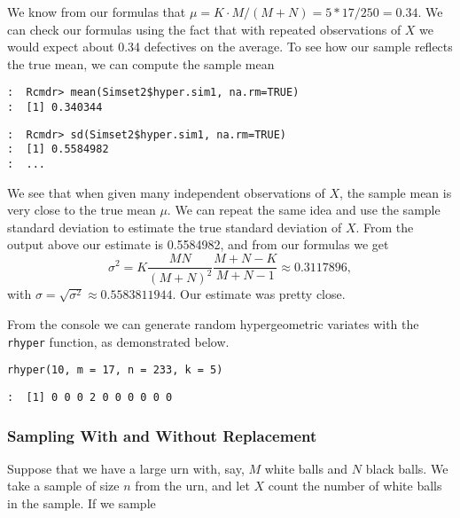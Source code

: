 We know from our formulas that \(\mu=K\cdot
M/(M+N)=5*17/250=0.34\). We can check our formulas using the fact that
with repeated observations of \(X\) we would expect about 0.34
defectives on the average. To see how our sample reflects the true
mean, we can compute the sample mean

\begin{verbatim}
:  Rcmdr> mean(Simset2$hyper.sim1, na.rm=TRUE)
:  [1] 0.340344
\end{verbatim}

\begin{verbatim}
:  Rcmdr> sd(Simset2$hyper.sim1, na.rm=TRUE)
:  [1] 0.5584982
:  ...
\end{verbatim}

We see that when given many independent observations of \(X\), the
sample mean is very close to the true mean \(\mu\). We can repeat the
same idea and use the sample standard deviation to estimate the true
standard deviation of \(X\). From the output above our estimate is
0.5584982, and from our formulas we get
\[
\sigma^{2}=K\frac{MN}{(M+N)^{2}}\frac{M+N-K}{M+N-1}\approx0.3117896,
\]
with \(\sigma=\sqrt{\sigma^{2}}\approx0.5583811944\). Our estimate was
pretty close.

From the console we can generate random hypergeometric variates with
the \texttt{rhyper} function, as demonstrated below.

\begin{verbatim}
rhyper(10, m = 17, n = 233, k = 5)
\end{verbatim}

\begin{verbatim}
:  [1] 0 0 0 2 0 0 0 0 0 0
\end{verbatim}

\subsubsection{Sampling With and Without Replacement}
\label{sec-5-6-1-2}

Suppose that we have a large urn with, say, \(M\) white balls and
\(N\) black balls. We take a sample of size \(n\) from the urn, and
let \(X\) count the number of white balls in the sample. If we sample

